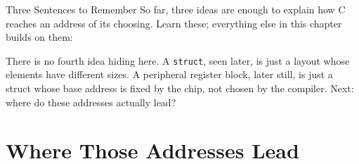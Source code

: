 \documentclass[9pt,aspectratio=169,xcolor=table]{beamer}
\begin{document}
\begin{frame}{Three Sentences to Remember}
    \leavevmode
    So far, three ideas are enough to explain how C reaches an address of
    its choosing. Learn these; everything else in this chapter builds on
    them:

    \vspace{4mm}
    \begin{center}
    \end{center}

    \vspace{2mm}
    {\small There is no fourth idea hiding here. A \texttt{struct},
    seen later, is just a layout whose elements have different sizes.
    A peripheral register block, later still, is just a struct whose
    base address is fixed by the chip, not chosen by the compiler.
    Next: \alert{where do these addresses actually lead?}}
\end{frame}

\section{Where Those Addresses Lead}
\end{document}
